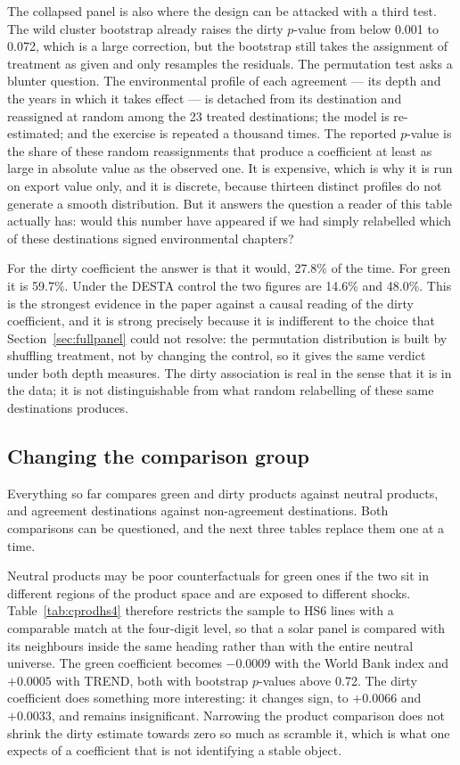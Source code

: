 \documentclass[11pt]{article}
\begin{document}
The collapsed panel is also where the design can be attacked with a third test. The wild cluster
bootstrap already raises the dirty $p$-value from below 0.001 to 0.072, which is a large correction,
but the bootstrap still takes the assignment of treatment as given and only resamples the residuals.
The permutation test asks a blunter question. The environmental profile of each agreement --- its
depth and the years in which it takes effect --- is detached from its destination and reassigned at
random among the 23 treated destinations; the model is re-estimated; and the exercise is repeated a
thousand times. The reported $p$-value is the share of these random reassignments that produce a
coefficient at least as large in absolute value as the observed one. It is expensive, which is why it
is run on export value only, and it is discrete, because thirteen distinct profiles do not generate a
smooth distribution. But it answers the question a reader of this table actually has: would this
number have appeared if we had simply relabelled which of these destinations signed environmental
chapters?

For the dirty coefficient the answer is that it would, 27.8\% of the time. For green it is 59.7\%.
Under the DESTA control the two figures are 14.6\% and 48.0\%. This is the strongest evidence in the
paper against a causal reading of the dirty coefficient, and it is strong precisely because it is
indifferent to the choice that Section~\ref{sec:fullpanel} could not resolve: the permutation
distribution is built by shuffling treatment, not by changing the control, so it gives the same
verdict under both depth measures. The dirty association is real in the sense that it is in the data;
it is not distinguishable from what random relabelling of these same destinations produces.



\FloatBarrier
\subsection{Changing the comparison group}\label{sec:comparison}

Everything so far compares green and dirty products against neutral products, and agreement
destinations against non-agreement destinations. Both comparisons can be questioned, and the next
three tables replace them one at a time.

Neutral products may be poor counterfactuals for green ones if the two sit in different regions of the
product space and are exposed to different shocks. Table~\ref{tab:cprodhs4} therefore restricts the
sample to HS6 lines with a comparable match at the four-digit level, so that a solar panel is compared
with its neighbours inside the same heading rather than with the entire neutral universe. The green
coefficient becomes $-0.0009$ with the World Bank index and $+0.0005$ with TREND, both with bootstrap
$p$-values above 0.72. The dirty coefficient does something more interesting: it changes sign, to
$+0.0066$ and $+0.0033$, and remains insignificant. Narrowing the product comparison does not shrink
the dirty estimate towards zero so much as scramble it, which is what one expects of a coefficient
that is not identifying a stable object.
\end{document}

